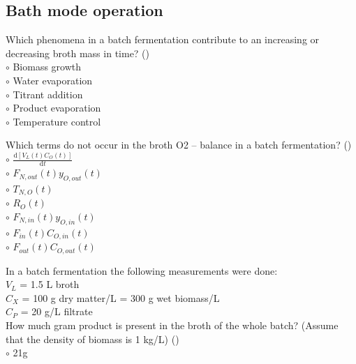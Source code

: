 \documentclass[]{beamer}
\begin{document}
\subsection{Bath mode operation}
\setcounter{questions}{0}
\begin{frame}[shrink] {}
\addtocounter{questions}{1}
\color{blue}
Which phenomena in a batch fermentation contribute to an increasing or decreasing broth mass in time? ()\\
\color{black}
\setlength{\parindent}{-0.4cm}
{\color{red}$\circ$}  Biomass growth \\
{\color{red}$\circ$} Water evaporation \\
{\color{red}$\circ$} Titrant addition \\
{\color{red}$\circ$} Product evaporation \\
{\color{red}$\circ$} Temperature control  \\
\end{frame}

\begin{frame}[shrink] {}
\addtocounter{questions}{1}
\color{blue}
Which terms do not occur in the broth O2 – balance in a batch fermentation? ()\\
\color{black}
\setlength{\parindent}{-0.4cm}
{\color{red}$\circ$} $\frac{\mathrm d [V_{L}(t)C_O(t)]}{\mathrm dt}$ \\[0.3em]
{\color{red}$\circ$} $F_{N,out}(t) y_{O,out}(t)$ \\
{\color{red}$\circ$} $T_{N,O} (t)$ \\
{\color{red}$\circ$} $R_O (t)$ \\
{\color{red}$\circ$} $F_{N,in}(t) y_{O,in}(t)$ \\
{\color{red}$\circ$} $F_{in}(t) C_{O,in}(t)$ \\
{\color{red}$\circ$} $F_{out}(t) C_{O,out}(t)$ \\
\end{frame}

\begin{frame}[shrink] {}
\addtocounter{questions}{1}
\color{blue}
In a batch fermentation the following measurements were done: \\
\color{gray}
$V_L$ = 1.5 L broth  \\
$C_X$ = 100 g dry matter/L = 300 g wet biomass/L \\
$C_P$ = 20 g/L filtrate \\
\color{blue}
How much gram product is present in the broth of the whole batch? 
(Assume that the density of biomass is 1 kg/L) ()\\
\color{black}
{\color{red}$\circ$} 21g \\
\end{frame}
\end{document}
